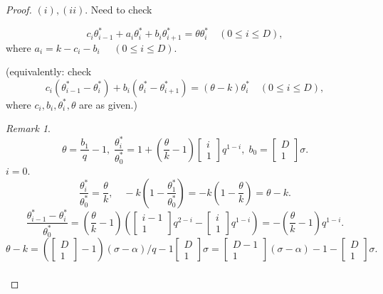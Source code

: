 \documentclass[
]{book}
\theoremstyle{definition}
\theoremstyle{definition}
\theoremstyle{definition}
\theoremstyle{definition}
\theoremstyle{remark}
\newtheorem*{remark}{Remark}
\begin{document}
\begin{proof}
\leavevmode

\((i), (ii)\). Need to check

\[c_i\theta^*_{i-1} + a_i\theta^*_i + b_i\theta^*_{i+1} = \theta \theta^*_i \quad (0\leq i\leq D),\]
where \(a_i = k-c_i - b_i\) \(\quad (0\leq i \leq D)\).

(equivalently: check
\begin{equation}
c_i(\theta^*_{i-1}-\theta^*_i) + b_i(\theta^*_i -\theta^*_{i+1}) = (\theta-k) \theta^*_i \quad (0\leq i\leq D),\label{eq:cibithetak}
\end{equation}
where \(c_i, b_i, \theta^*_i, \theta\) are as given.)

\begin{remark}
\[\theta = \frac{b_1}{q}-1, \; \frac{\theta^*_i}{\theta^*_0} = 1 + \left(\frac{\theta}{k}-1\right)\begin{bmatrix}{i}\\{1}\end{bmatrix} q^{1-i}, \; b_0 = \begin{bmatrix}{D}\\{1}\end{bmatrix}\sigma.\]
\(i=0\).
\[\frac{\theta^*_i}{\theta^*_0} = \frac{\theta}{k}, \quad - k\left(1-\frac{\theta^*_1}{\theta^*_0}\right)= -k(1-\frac{\theta}{k}) = \theta -k.\]
\[\frac{\theta^*_{i-1}-\theta^*_i}{\theta^*_0} = \left(\frac{\theta}{k}-1\right)\left(\begin{bmatrix}{i-1}\\{1}\end{bmatrix}q^{2-i}-\begin{bmatrix}{i}\\{1}\end{bmatrix}q^{1-i}\right)=-\left(\frac{\theta}{k}-1\right)q^{1-i}.\]
\[\theta-k=\left(\begin{bmatrix}{D}\\{1}\end{bmatrix}-1\right)(\sigma-\alpha)/q-1 \begin{bmatrix}{D}\\{1}\end{bmatrix}\sigma = \begin{bmatrix}{D-1}\\{1}\end{bmatrix}(\sigma-\alpha)-1-\begin{bmatrix}{D}\\{1}\end{bmatrix}\sigma.\]
\begin{align}

\end{align}
\end{remark}
\end{proof}
\end{document}
